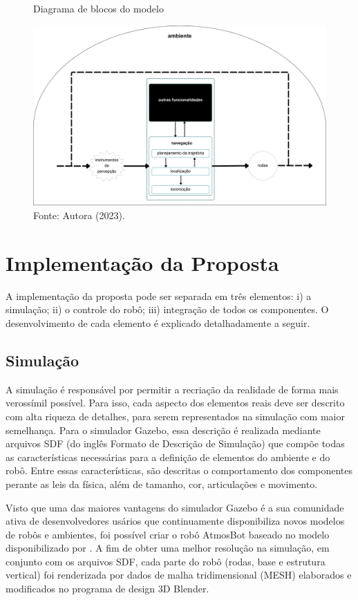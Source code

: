 \begin{figure}[h]
    \centering
    \caption{Diagrama de blocos do modelo}
    \includegraphics[scale=0.08]{blocos.png}
   
    \caption*{Fonte: Autora (2023).}
    \label{fig:blocos}
\end{figure}


\section{Implementação da Proposta}
A implementação da proposta pode ser separada em três elementos: i) a simulação; ii) o controle do robô; iii) integração de todos os componentes. O desenvolvimento de cada elemento é explicado detalhadamente a seguir.

\subsection{Simulação}
A simulação é responsável por permitir a recriação da realidade de forma mais verossímil possível. Para isso, cada aspecto dos elementos reais deve ser descrito com alta riqueza de detalhes, para serem representados na simulação com maior semelhança. Para o simulador Gazebo, essa descrição é realizada mediante arquivos SDF (do inglês Formato de Descrição de Simulação) que compõe todas as características necessárias para a definição de elementos do ambiente e do robô. Entre essas características, são descritas o comportamento dos componentes perante as leis da física, além de tamanho, cor, articulações e movimento.

Visto que uma das maiores vantagens do simulador Gazebo é a sua comunidade ativa de desenvolvedores usários que continuamente disponibiliza novos modelos de robôs e ambientes, foi possível criar o robô AtmosBot baseado no modelo disponibilizado por \citet{modeloRobo}. A fim de obter uma melhor resolução na simulação, em conjunto com os arquivos SDF, cada parte do robô (rodas, base e estrutura vertical) foi renderizada por dados de malha tridimensional (MESH) elaborados e modificados no programa de design 3D Blender.


